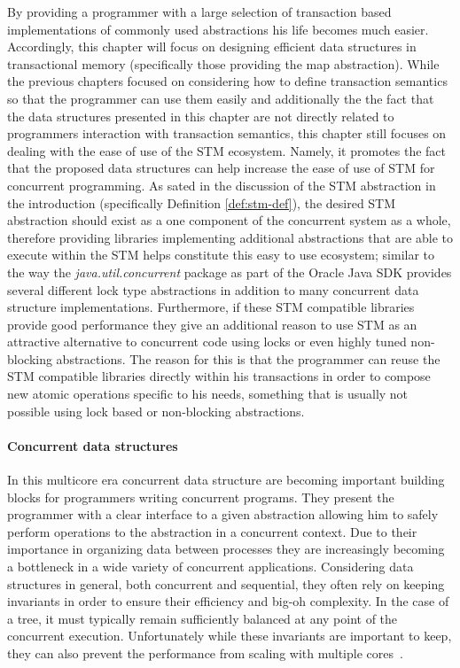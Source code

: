 By providing a programmer with a large selection of transaction based implementations of commonly used abstractions
his life becomes much easier.
Accordingly, this chapter will focus on designing efficient data structures in transactional memory (specifically those providing the map abstraction).
While the previous chapters focused on considering how to define transaction semantics so that the programmer can use them easily and additionally
the the fact that the data structures presented in this chapter are not directly related to programmers interaction with transaction semantics,
this chapter still focuses on dealing with the ease of use of the STM ecosystem.
Namely, it promotes the fact that the proposed data structures can help increase the ease of use of STM for concurrent programming.
As sated in the discussion of the STM abstraction in the introduction (specifically Definition \ref{def:stm-def}), the desired STM abstraction
should exist as a one component of the concurrent system as a whole, therefore providing libraries implementing additional abstractions
that are able to execute within the STM helps constitute this easy to use ecosystem; similar to the way the \emph{java.util.concurrent}
package as part of the Oracle Java SDK \cite{javasdk} provides several different lock type abstractions in addition to many concurrent data structure
implementations.
Furthermore, if these STM compatible libraries provide good performance they give an additional reason to use STM as an attractive alternative to
concurrent code using locks or even highly tuned non-blocking abstractions.
The reason for this is that the programmer can reuse
the STM compatible libraries directly within his transactions in order to compose new atomic operations specific to his needs,
something that is usually not possible using lock based or non-blocking abstractions.


\paragraph{Concurrent data structures}
In this multicore era concurrent data structure are becoming important building blocks
for programmers writing concurrent programs.
They present the programmer with a clear interface to a given abstraction allowing
him to safely perform operations to the abstraction in a concurrent context.
Due to their importance in organizing data between processes they are increasingly becoming a bottleneck
in a wide variety of concurrent applications.
Considering data structures in general, both concurrent and sequential, they often rely on keeping invariants
in order to ensure their efficiency and big-oh complexity.
In the case of a tree, it must typically remain sufficiently balanced at any point of the concurrent execution.
Unfortunately while these invariants are important to keep, they can also prevent
the performance from scaling with multiple cores~\cite{Sha2011}.

